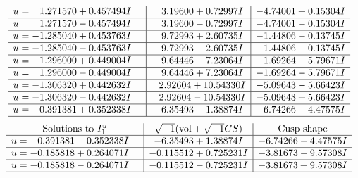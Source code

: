\documentclass[1p]{elsarticle_modified}
\theoremstyle{definition}
\newcommand{\I}{\sqrt{-1}}
\begin{document}
$$\begin{array}{c|c|c}
\begin{aligned}
u &= \phantom{-}1.271570 + 0.457494 I\end{aligned}
 & \phantom{-}3.19600 + 0.72997 I & -4.74001 + 0.15304 I \\ \hline\begin{aligned}
u &= \phantom{-}1.271570 - 0.457494 I\end{aligned}
 & \phantom{-}3.19600 - 0.72997 I & -4.74001 - 0.15304 I \\ \hline\begin{aligned}
u &= -1.285040 + 0.453763 I\end{aligned}
 & \phantom{-}9.72993 + 2.60735 I & -1.44806 - 0.13745 I \\ \hline\begin{aligned}
u &= -1.285040 - 0.453763 I\end{aligned}
 & \phantom{-}9.72993 - 2.60735 I & -1.44806 + 0.13745 I \\ \hline\begin{aligned}
u &= \phantom{-}1.296000 + 0.449004 I\end{aligned}
 & \phantom{-}9.64446 - 7.23064 I & -1.69264 + 5.79671 I \\ \hline\begin{aligned}
u &= \phantom{-}1.296000 - 0.449004 I\end{aligned}
 & \phantom{-}9.64446 + 7.23064 I & -1.69264 - 5.79671 I \\ \hline\begin{aligned}
u &= -1.306320 + 0.442632 I\end{aligned}
 & \phantom{-}2.92604 + 10.54330 I & -5.09643 - 5.66423 I \\ \hline\begin{aligned}
u &= -1.306320 - 0.442632 I\end{aligned}
 & \phantom{-}2.92604 - 10.54330 I & -5.09643 + 5.66423 I \\ \hline\begin{aligned}
u &= \phantom{-}0.391381 + 0.352338 I\end{aligned}
 & -6.35493 - 1.38874 I & -6.74266 + 4.47575 I\\
 \hline 
 \end{array}$$\newpage$$\begin{array}{c|c|c}  
\text{Solutions to }I^u_{1}& \I (\text{vol} + \sqrt{-1}CS) & \text{Cusp shape}\\
 \hline 
\begin{aligned}
u &= \phantom{-}0.391381 - 0.352338 I\end{aligned}
 & -6.35493 + 1.38874 I & -6.74266 - 4.47575 I \\ \hline\begin{aligned}
u &= -0.185818 + 0.264071 I\end{aligned}
 & -0.115512 + 0.725231 I & -3.81673 - 9.57308 I \\ \hline\begin{aligned}
u &= -0.185818 - 0.264071 I\end{aligned}
 & -0.115512 - 0.725231 I & -3.81673 + 9.57308 I\\
 \hline 
 \end{array}$$\newpage
\end{document}
